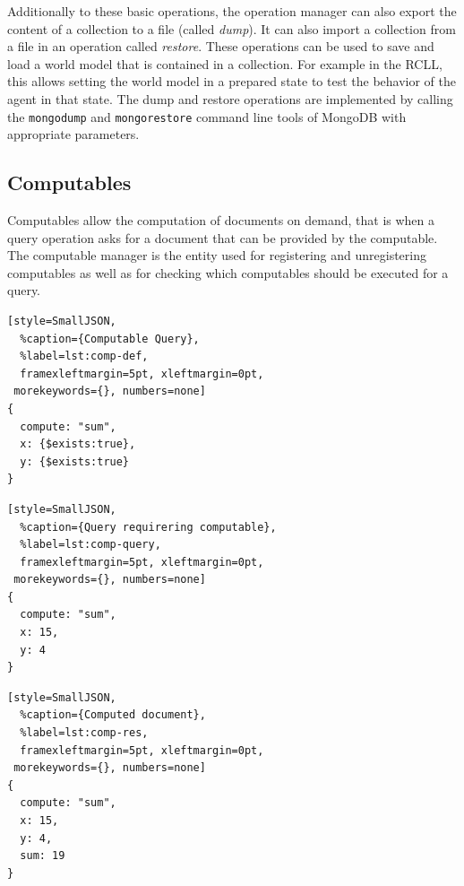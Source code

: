 Additionally to these basic operations, the operation manager can also
export the content of a collection to a file (called \emph{dump}). It
can also import a collection from a file in an operation called
\emph{restore}. These operations can be used to save and load a world
model that is contained in a collection. For example in the RCLL, this
allows setting the world model in a prepared state to test the
behavior of the agent in that state. The dump and restore operations
are implemented by calling the \texttt{mongodump} and
\texttt{mongorestore} command line tools of MongoDB with appropriate
parameters.

\subsection{Computables}
\label{sec:impl-computables}
Computables allow the computation of documents on demand, that is when
a query operation asks for a document that can be provided by the
computable. The computable manager is the entity used for registering
and unregistering computables as well as for checking which
computables should be executed for a query.\\
\begin{listing}
\addtocounter{listing}{4}
\addtocounter{lstlisting}{1}
\noindent
\begin{minipage}[b]{.30\textwidth}
\begin{lstlisting}[style=SmallJSON,
  %caption={Computable Query},
  %label=lst:comp-def,
  framexleftmargin=5pt, xleftmargin=0pt,
 morekeywords={}, numbers=none]
{
  compute: "sum",
  x: {$exists:true},
  y: {$exists:true}
}
\end{lstlisting}
\end{minipage}%
\hfill
\begin{minipage}[b]{.25\textwidth}
\begin{lstlisting}[style=SmallJSON,
  %caption={Query requirering computable},
  %label=lst:comp-query,
  framexleftmargin=5pt, xleftmargin=0pt,
 morekeywords={}, numbers=none]
{
  compute: "sum",
  x: 15,
  y: 4
}
\end{lstlisting}
\end{minipage}%
\hfill
\begin{minipage}[b]{.25\textwidth}
\begin{lstlisting}[style=SmallJSON,
  %caption={Computed document},
  %label=lst:comp-res,
  framexleftmargin=5pt, xleftmargin=0pt,
 morekeywords={}, numbers=none]
{
  compute: "sum",
  x: 15,
  y: 4,
  sum: 19
}
\end{lstlisting}
  \vspace{-0.3cm}
  \vspace{0.3cm}
\end{minipage}%
\caption{Queries and documents involved in a computable for addition}
\label{lst:comp}
\end{listing}
